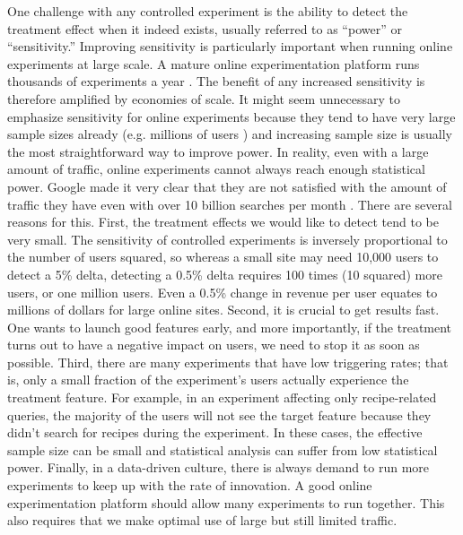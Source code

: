 \documentclass{sig-alternate}
\begin{document}
One challenge with any controlled experiment is the ability to detect the treatment effect when it indeed exists, usually referred to as ``power'' or ``sensitivity.'' Improving sensitivity is particularly important when running online experiments at large scale. A mature online experimentation platform runs thousands of experiments a year \citep{puzzlingOutcomes,Manzi}. The benefit of any increased sensitivity is therefore amplified by economies of scale. It might seem unnecessary to emphasize sensitivity for online experiments because they tend to have very large sample sizes already (e.g. millions of users \citep{comScore}) and increasing sample size is usually the most straightforward way to improve power. In reality, even with a large amount of traffic, online experiments cannot always reach enough statistical power. Google made it very clear that they are not satisfied with the amount of traffic they have \citep[Slide 6]{googleslide} even with over 10 billion searches per month \citep{comScore}. There are several reasons for this. First, the treatment effects we would like to detect tend to be very small. The sensitivity of controlled experiments is inversely proportional to the number of users squared, so whereas a small site may need 10,000 users to detect a 5\% delta, detecting a 0.5\% delta requires 100 times (10 squared) more users, or one million users. Even a 0.5\% change in revenue per user equates to millions of dollars for large online sites. Second, it is crucial to get results fast. One wants to launch good features early, and more importantly, if the treatment turns out to have a negative impact on users, we need to stop it as soon as possible. Third, there are many experiments that have low triggering rates; that is, only a small fraction of the experiment's users actually experience the treatment feature. For example, in an experiment affecting only recipe-related queries, the majority of the users will not see the target feature because they didn't search for recipes during the experiment. In these cases, the effective sample size can be small and statistical analysis can suffer from low statistical power. 
Finally, in a data-driven culture, there is always demand to run more experiments to keep up with the rate of innovation. A good online experimentation platform should allow many experiments to run together. This also requires that we make optimal use of large but still limited traffic.   


\end{document}
